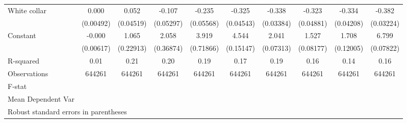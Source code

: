 {\begin{tabular}{l*{9}{c}}
White collar        &       0.000         &       0.052         &      -0.107\sym{*}  &      -0.235\sym{***}&      -0.325\sym{***}&      -0.338\sym{***}&      -0.323\sym{***}&      -0.334\sym{***}&      -0.382\sym{***}\\
                    &   (0.00492)         &   (0.04519)         &   (0.05297)         &   (0.05568)         &   (0.04543)         &   (0.03384)         &   (0.04881)         &   (0.04208)         &   (0.03224)         \\
Constant            &      -0.000         &       1.065\sym{***}&       2.058\sym{***}&       3.919\sym{***}&       4.544\sym{***}&       2.041\sym{***}&       1.527\sym{***}&       1.708\sym{***}&       6.799\sym{***}\\
                    &   (0.00617)         &   (0.22913)         &   (0.36874)         &   (0.71866)         &   (0.15147)         &   (0.07313)         &   (0.08177)         &   (0.12005)         &   (0.07822)         \\
\hline
R-squared           &        0.01         &        0.21         &        0.20         &        0.19         &        0.17         &        0.19         &        0.16         &        0.14         &        0.16         \\
Observations        &      644261         &      644261         &      644261         &      644261         &      644261         &      644261         &      644261         &      644261         &      644261         \\
F-stat              &                     &                     &                     &                     &                     &                     &                     &                     &                     \\
Mean Dependent Var  &                     &                     &                     &                     &                     &                     &                     &                     &                     \\
\hline\hline
\multicolumn{10}{l}{\footnotesize Robust standard errors in parentheses}\\
\end{tabular}
}

